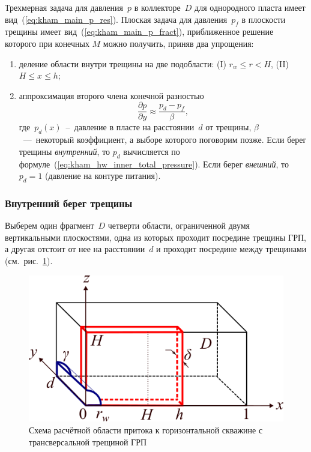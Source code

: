 \documentclass{article}
\begin{document}
Трехмерная задача для давления~$p$ в коллекторе~$D$ для однородного пласта имеет вид~(\ref{eq:kham_main_p_res}).
Плоская задача для давления~$p_f$ в плоскости трещины имеет вид~(\ref{eq:kham_main_p_fract}),
приближенное решение которого при конечных $M$ можно получить, приняв два упрощения:
\begin{enumerate}
	\item деление области внутри трещины на две подобласти: (I) $r_w \leq r < H$, (II) $H \leq x \leq h$;
	\item  аппроксимация второго члена конечной разностью
	      \begin{equation}
		      \displaystyle
		      \dfrac{\partial p}{\partial y} \approx \dfrac{ p_d - p_f}{\beta},
		      \label{eq:kham_dpdy_approx}
	      \end{equation}
	      где~$p_d(x)$~--~давление в пласте на расстоянии~$d$ от трещины, $\beta$~---~некоторый коэффициент, а выборе
	      которого поговорим позже.
	      Если берег трещины \emph{внутренний}, то $p_d$ вычисляется по формуле~(\ref{eq:kham_hw_inner_total_pressure}).
	      Если берег \emph{внешний}, то $p_d = 1$ (давление на контуре питания).
\end{enumerate}

\subsubsection{Внутренний берег трещины}
Выберем один фрагмент~$D$ четверти области, ограниченной двумя вертикальными плоскостями, одна из которых
проходит посредине трещины ГРП, а другая отстоит от нее на расстоянии~$d$ и проходит посредине между
трещинами (см.~рис.~\ref{fig:kham_fract_inner_scheme}).

\begin{figure}[H]
	\centering
	\includegraphics[width=0.7\linewidth]{images/schemes/kham_fract_inner_scheme.png}
	\caption{Схема расчётной области притока к горизонтальной скважине с трансверсальной трещиной ГРП}
	\label{fig:kham_fract_inner_scheme}
\end{figure}
\end{document}
